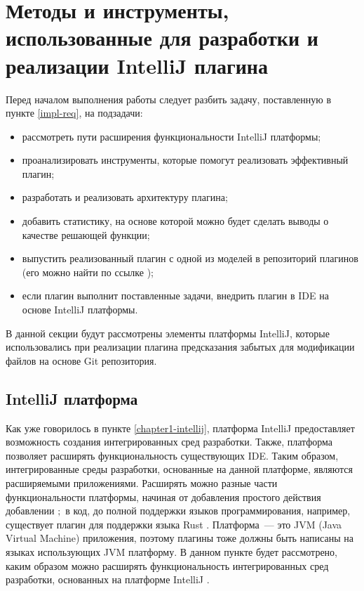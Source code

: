 \section{Методы и инструменты, использованные для разработки и реализации IntelliJ плагина}\label{chapter2-plugin-req}
Перед началом выполнения работы следует разбить задачу, поставленную в пункте \ref{impl-req}, на подзадачи:
    \begin{itemize}
        \item рассмотреть пути расширения функциональности IntelliJ платформы;
        \item проанализировать инструменты, которые помогут реализовать эффективный плагин;
        \item разработать и реализовать архитектуру плагина;
        \item добавить статистику, на основе которой можно будет сделать выводы о качестве решающей функции;
        \item выпустить реализованный плагин с одной из моделей в репозиторий плагинов (его можно найти по ссылке \cite{plugins-jetbrains});
        \item если плагин выполнит поставленные задачи, внедрить плагин в IDE на основе IntelliJ платформы.
    \end{itemize}
В данной секции будут рассмотрены элементы платформы IntelliJ, которые использовались при реализации плагина предсказания забытых для модификации файлов на основе Git репозитория.
    \subsection{IntelliJ платформа}\label{ij-platform-req}
Как уже говорилось в пункте \ref{chapter1-intellij}, платформа IntelliJ предоставляет возможность создания интегрированных сред разработки. Также, платформа позволяет расширять функциональность существующих IDE. Таким образом, интегрированные среды разработки, основанные на данной платформе, являются расширяемыми приложениями. Расширять можно разные части функциональности платформы, начиная от добавления простого действия добавлении $;$ в код, до полной поддержки языков программирования, например, существует плагин для поддержки языка Rust \cite{rust}. Платформа~--- это JVM (Java Virtual Machine) приложения, поэтому плагины тоже должны быть написаны на языках использующих JVM платформу. В данном пункте будет рассмотрено, каким образом можно расширять функциональность интегрированных сред разработки, основанных на платформе IntelliJ \cite{intellij-sdk}.

